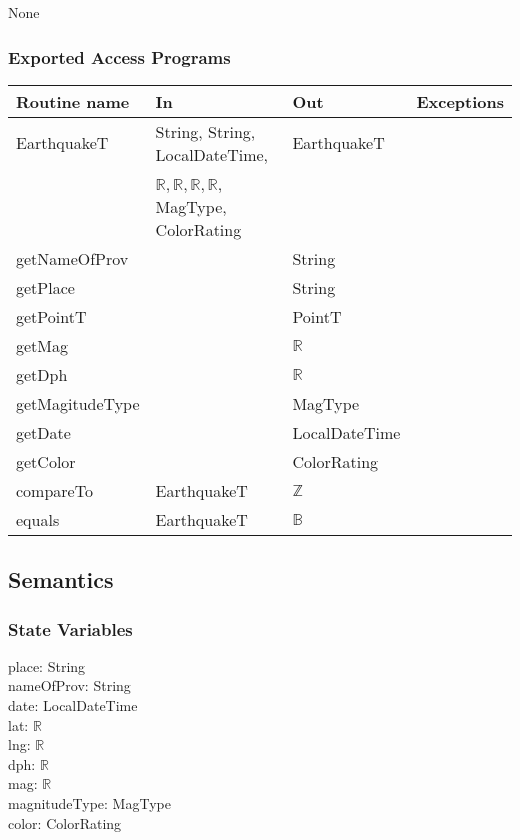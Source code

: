 \documentclass[12pt]{article}
\begin{document}
None

\subsubsection* {Exported Access Programs}

\begin{tabular}{| l | l | l | l |}
\hline
\textbf{Routine name} & \textbf{In} & \textbf{Out} & \textbf{Exceptions}\\
\hline
EarthquakeT & String, String, LocalDateTime, & EarthquakeT &\\
\hhline{|~|~|~|}
~ &$\mathbb{R}, \mathbb{R}, \mathbb{R}, \mathbb{R}$, MagType, ColorRating & ~ &\\
\hline
getNameOfProv & ~ & String & \\
\hline
getPlace & ~ & String & \\
\hline
getPointT & ~ & PointT & \\
\hline
getMag & ~ & $\mathbb{R}$ & \\
\hline
getDph & ~ & $\mathbb{R}$ & \\
\hline
getMagitudeType & ~ & MagType & \\
\hline
getDate & ~ & LocalDateTime & \\
\hline
getColor & ~ & ColorRating & \\
\hline
compareTo & EarthquakeT & $\mathbb{Z}$ & \\
\hline
equals & EarthquakeT & $\mathbb{B}$ & \\
\hline
\end{tabular}

\newpage

\subsection* {Semantics}

\subsubsection* {State Variables}

place: String\\ 
nameOfProv: String\\
date: LocalDateTime\\
lat: $\mathbb{R}$\\
lng: $\mathbb{R}$\\
dph: $\mathbb{R}$\\
mag: $\mathbb{R}$\\
magnitudeType: MagType\\
color: ColorRating
\end{document}
